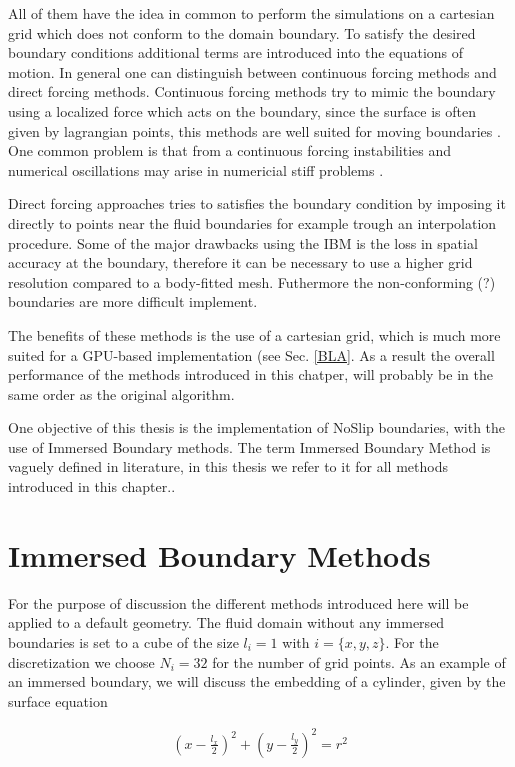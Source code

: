 All of them have the idea in common to perform the simulations on a cartesian grid which does not conform to the domain boundary.
To satisfy the desired boundary conditions additional terms are introduced into the equations of motion.
In general one can distinguish between continuous forcing methods and direct forcing methods.
Continuous forcing methods try to mimic the boundary using a localized force which acts on the boundary,
since the surface is often given by lagrangian points, this methods are well suited for moving boundaries \citep{Mittal2005}.
One common problem is that from a continuous forcing instabilities and numerical oscillations may arise in numericial stiff problems \citep{QUOTE}.

Direct forcing approaches tries to satisfies the boundary condition by imposing it directly to points near the fluid boundaries for example
trough an interpolation procedure.
Some of the major drawbacks using the IBM is the loss in  spatial accuracy at the boundary, therefore it can be necessary to use a higher grid resolution
compared to a body-fitted mesh.  Futhermore the non-conforming (?) boundaries are more difficult implement.

The benefits of these methods is the use of a cartesian grid, which is much more suited for a GPU-based implementation (see Sec. \ref{BLA}.
As a result the overall performance of the methods introduced in this chatper,  will probably be in the same order as the original algorithm.

One objective of this thesis is the implementation of NoSlip boundaries, with the use of Immersed Boundary methods.
The term Immersed Boundary Method is vaguely defined in literature, in this thesis we refer to it for all methods introduced in this chapter..

\section{Immersed Boundary Methods}

For the purpose of discussion the different methods introduced here will be applied to a default geometry.
The fluid domain without any immersed boundaries is set to a cube of the size $l_i= 1$ with  $i = \{x, y, z\}$.
For the discretization we choose $N_i = 32$ for the number of grid points.
As an example of an immersed boundary, we will discuss the embedding of a cylinder, given by the  surface equation

\begin{align}
    \label{ibm:eq_cylinder_intro}
    \left(x - \frac{l_x}{2}\right)^2 + \left(y - \frac{l_y}{2}\right)^2 = r^2
\end{align}

